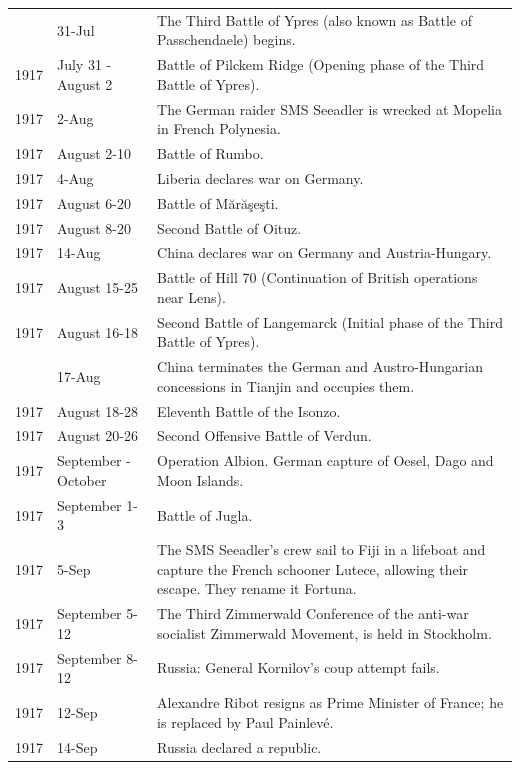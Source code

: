\documentclass[
  openany]{book}
\begin{document}
\begin{longtable}[t]{rl>{\raggedright\arraybackslash}p{22em}}
\addlinespace
1917 & 31-Jul & The Third Battle of Ypres (also known as Battle of Passchendaele) begins.\\
\rowcolor{gray!6}  1917 & July 31 - August 2 & Battle of Pilckem Ridge (Opening phase of the Third Battle of Ypres).\\
1917 & 2-Aug & The German raider SMS Seeadler is wrecked at Mopelia in French Polynesia.\\
\rowcolor{gray!6}  1917 & August 2-10 & Battle of Rumbo.\\
1917 & 4-Aug & Liberia declares war on Germany.\\
\addlinespace
\rowcolor{gray!6}  1917 & August 6-20 & Battle of Mărăşeşti.\\
1917 & August 8-20 & Second Battle of Oituz.\\
\rowcolor{gray!6}  1917 & 14-Aug & China declares war on Germany and Austria-Hungary.\\
1917 & August 15-25 & Battle of Hill 70 (Continuation of British operations near Lens).\\
\rowcolor{gray!6}  1917 & August 16-18 & Second Battle of Langemarck (Initial phase of the Third Battle of Ypres).\\
\addlinespace
1917 & 17-Aug & China terminates the German and Austro-Hungarian concessions in Tianjin and occupies them.\\
\rowcolor{gray!6}  1917 & August 18-28 & Eleventh Battle of the Isonzo.\\
1917 & August 20-26 & Second Offensive Battle of Verdun.\\
\rowcolor{gray!6}  1917 & September - October & Operation Albion. German capture of Oesel, Dago and Moon Islands.\\
1917 & September 1-3 & Battle of Jugla.\\
\addlinespace
\rowcolor{gray!6}  1917 & 5-Sep & The SMS Seeadler's crew sail to Fiji in a lifeboat and capture the French schooner Lutece, allowing their escape. They rename it Fortuna.\\
1917 & September 5-12 & The Third Zimmerwald Conference of the anti-war socialist Zimmerwald Movement, is held in Stockholm.\\
\rowcolor{gray!6}  1917 & September 8-12 & Russia: General Kornilov's coup attempt fails.\\
1917 & 12-Sep & Alexandre Ribot resigns as Prime Minister of France; he is replaced by Paul Painlevé.\\
\rowcolor{gray!6}  1917 & 14-Sep & Russia declared a republic.\\

\end{longtable}
\end{document}
